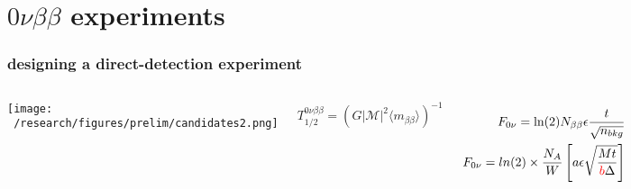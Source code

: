 \documentclass{beamer}
\begin{document}
\section{$0\nu\beta\beta$ experiments}
	
	\begin{frame}
		\frametitle{designing a direct-detection experiment}
		\begin{columns}[c] %
			
			\hspace*{-0.5cm}\texttt{[image: ~/research/figures/prelim/candidates2.png]}
			
			\begin{equation*}
			T_{1/2}^{0\nu\beta\beta} = \left( G|\mathcal{M}|^2 \langle m_{\beta\beta}\rangle \right) ^{-1}
			\end{equation*}
			
%			
			\begin{eqnarray*}
			F_{0\nu} =  \text{ln}(2)N_{\beta\beta}\epsilon \frac{t}{\sqrt{n_{bkg}}} \\
			F_{0\nu} = ln(2) \times \frac{N_A}{W} \left[ a\epsilon \sqrt{\frac{Mt}{\textcolor{red}{b}\Delta}}\right]
			\end{eqnarray*}
		\end{columns}
	\end{frame}
	
\end{document}
